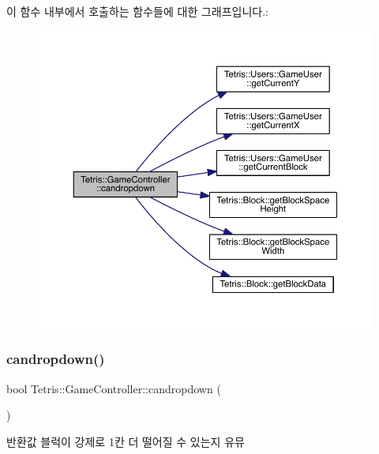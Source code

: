 이 함수 내부에서 호출하는 함수들에 대한 그래프입니다.\+:
\nopagebreak
\begin{figure}[H]
\begin{center}
\leavevmode
\includegraphics[width=350pt]{db/dd2/class_tetris_1_1_game_controller_ac4993d5ad8640ac617fec341fdb301ee_cgraph}
\end{center}
\end{figure}
\mbox{\label{class_tetris_1_1_game_controller_ac4993d5ad8640ac617fec341fdb301ee}} 
\subsubsection{\texorpdfstring{candropdown()}{candropdown()}\hspace{0.1cm}{\footnotesize\ttfamily [2/2]}}
{\footnotesize\ttfamily bool Tetris\+::\+Game\+Controller\+::candropdown (\begin{DoxyParamCaption}{ }\end{DoxyParamCaption})\hspace{0.3cm}{\ttfamily [inline]}}

\begin{DoxyReturn}{반환값}
블럭이 강제로 1칸 더 떨어질 수 있는지 유뮤 
\end{DoxyReturn}


